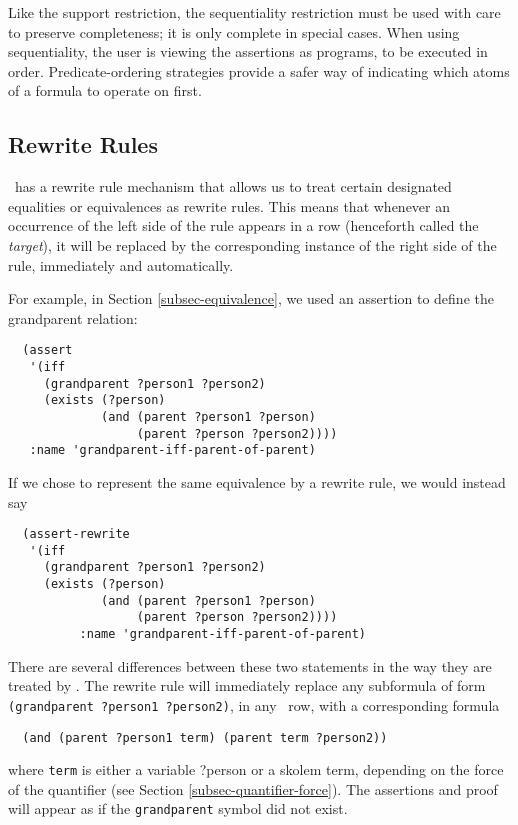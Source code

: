  Like the support restriction, the sequentiality restriction must be used
with care to preserve completeness; it is only complete in special cases.
When using sequentiality, the user is viewing the assertions as programs, to
be executed in order.  Predicate-ordering strategies provide a safer way of
indicating which atoms of a formula to operate on first.


\subsection{Rewrite Rules}
\label{subsec-rewrite-rules}
\Snark\  has a rewrite rule mechanism that allows us to treat certain
designated equalities or equivalences as rewrite rules.  This means
that whenever an occurrence of the left side of the rule appears in a
row (henceforth called the {\em target}), it will be replaced by the
corresponding instance of the right side of the rule, immediately and
automatically.

For example, in Section \ref{subsec-equivalence}, we used an
assertion to define the grandparent relation:
\begin{verbatim}
  (assert
   '(iff
     (grandparent ?person1 ?person2)
     (exists (?person)
             (and (parent ?person1 ?person)
                  (parent ?person ?person2))))
   :name 'grandparent-iff-parent-of-parent)
\end{verbatim}

If we chose to represent the same equivalence by a rewrite rule, we would
instead say
\begin{verbatim}
  (assert-rewrite
   '(iff
     (grandparent ?person1 ?person2)
     (exists (?person)
             (and (parent ?person1 ?person)
                  (parent ?person ?person2))))
          :name 'grandparent-iff-parent-of-parent)
\end{verbatim}

There are several differences between these two statements in the way
they are treated by \snark\/.  The rewrite rule will immediately
replace any subformula of form \verb'(grandparent ?person1 ?person2)',
in any \snark\  row, with a corresponding formula
\begin{verbatim}
  (and (parent ?person1 term) (parent term ?person2))
\end{verbatim}
where {\tt term} is either a variable {?person} or a skolem term,
depending on the force of the quantifier (see Section
\ref{subsec-quantifier-force}).
The assertions and proof will appear as if the {\tt grandparent}
symbol did not exist.

